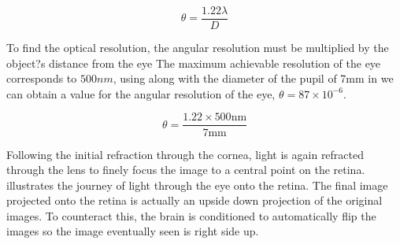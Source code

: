 \begin{equation}
\theta=\frac{1.22\lambda}{D}
\label{eq:res_limit}
\end{equation}

To find the optical resolution, the angular resolution must be multiplied by the
object?s distance from the eye The maximum achievable resolution of the eye
corresponds  to $500nm$, using  along with the diameter of
the pupil of 7mm in  we can obtain a value for the angular
resolution of the eye, $\theta=87\times 10^{-6}$.

\begin{equation}
\theta=\frac{1.22\times 500\textrm{nm}}{7\textrm{mm}}
\label{eq:eye_res}
\end{equation}

Following the initial refraction through the \gls{cornea}, light is again refracted
through the lens to finely focus the image to a central point on the retina.
 illustrates the journey of light through the eye
onto the retina. The final image projected onto the retina is actually an
upside down projection of the original images. To counteract this, the
brain is conditioned to automatically flip the images so the image eventually
seen is right side up.

